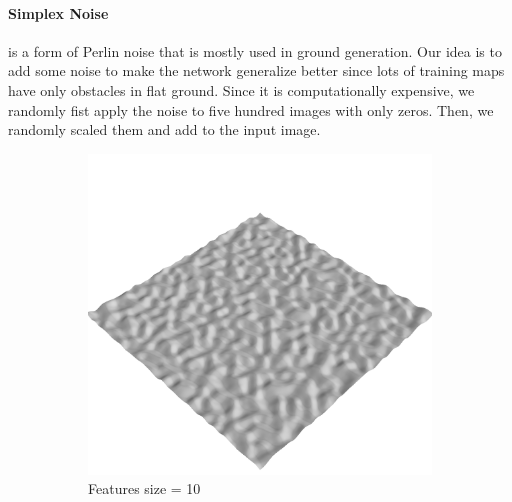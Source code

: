 \documentclass[../document.tex]{subfiles}
\begin{document}
\paragraph{Simplex Noise} is a form of Perlin noise that is mostly used in ground generation. Our idea is to add some noise to make the network generalize better since lots of training maps have only obstacles in flat ground. Since it is computationally expensive, we randomly fist apply the noise to five hundred images with only zeros. Then, we randomly scaled them and add to the input image. 
\begin{figure}[H]
    \centering

        \begin{subfigure}[b]{0.32\textwidth}
            \includegraphics[width=\textwidth]{../img/data-aug/3d/simplex1.png}
            \caption{Features size = 10}
        \end{subfigure}
        \begin{subfigure}[b]{0.32\linewidth}

\end{subfigure}
\end{figure}
\end{document}
